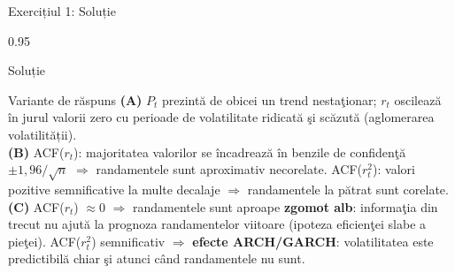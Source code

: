 \documentclass[9pt, aspectratio=169, t]{beamer}
\begin{document}
\begin{frame}{Exercițiul 1: Soluție}
    \begin{cminipage}{0.95\textwidth}
    \begin{exampleblock}{Soluție}
        {\small
        \begin{block}{Variante de răspuns}
        \textcolor{MainBlue}{\textbf{(A)}} $P_t$ prezintă de obicei un trend nestaţionar; $r_t$ oscilează în jurul valorii zero cu perioade de volatilitate ridicată şi scăzută (aglomerarea volatilității).\\[3pt]
        \textcolor{MainBlue}{\textbf{(B)}} ACF($r_t$): majoritatea valorilor se încadrează în benzile de confidenţă $\pm 1{,}96/\sqrt{n}$ $\Rightarrow$ randamentele sunt aproximativ necorelate. ACF($r_t^2$): valori pozitive semnificative la multe decalaje $\Rightarrow$ randamentele la pătrat sunt corelate.\\[3pt]
        \textcolor{MainBlue}{\textbf{(C)}} ACF($r_t$) $\approx 0$ $\Rightarrow$ randamentele sunt aproape \textbf{zgomot alb}: informaţia din trecut nu ajută la prognoza randamentelor viitoare (ipoteza eficienţei slabe a pieţei). ACF($r_t^2$) semnificativ $\Rightarrow$ \textbf{efecte ARCH/GARCH}: volatilitatea este predictibilă chiar şi atunci când randamentele nu sunt.
        \end{block}
        }
    \end{exampleblock}
    \end{cminipage}
\end{frame}
\end{document}

